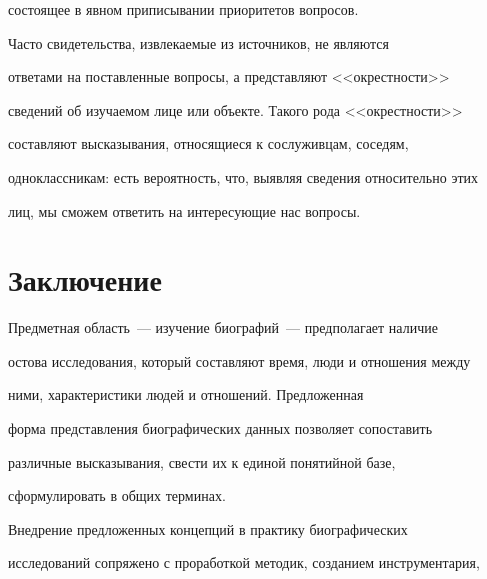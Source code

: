 состоящее в явном приписывании приоритетов вопросов.


   


     Часто свидетельства, извлекаемые из источников, не являются 


ответами на поставленные вопросы, а  представляют <<окрестности>> 


сведений об изучаемом лице или объекте. Такого рода <<окрестности>> 


составляют высказывания, относящиеся к сослуживцам, соседям, 


одноклассникам: есть вероятность, что, выявляя сведения относительно этих 


лиц, мы сможем ответить на интересующие нас вопросы.


{





}





\vspace*{-5pt}





\section{Заключение}





\vspace*{-5pt}





     Предметная область~--- изучение биографий~--- предполагает наличие 


остова исследования, который составляют время, люди и отношения между 


ними, характеристики людей и отношений. Предложенная 


форма представления биографических данных позволяет сопоставить 


различные высказывания, свести их к единой понятийной базе, 


сформулировать в общих терминах. 


     


     Внедрение предложенных концепций в практику биографических 


исследований сопряжено с проработкой методик, созданием инструментария, 


